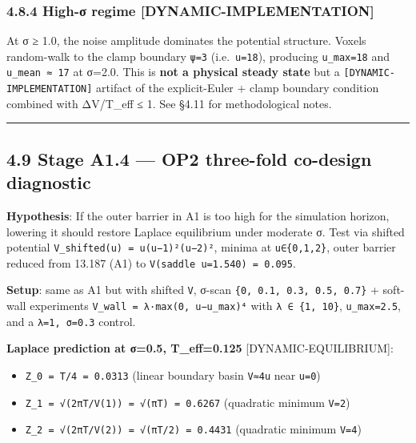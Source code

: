 \documentclass[
]{article}
\providecommand{\tightlist}{%
  \setlength{\itemsep}{0pt}\setlength{\parskip}{0pt}}
\begin{document}
\hypertarget{high-ux3c3-regime-dynamic-implementation}{%
\subsubsection{4.8.4 High-σ regime
{[}DYNAMIC-IMPLEMENTATION{]}}\label{high-ux3c3-regime-dynamic-implementation}}

At σ ≥ 1.0, the noise amplitude dominates the potential structure.
Voxels random-walk to the clamp boundary
\texttt{\textbar{}ψ\textbar{}=3} (i.e.~\texttt{u=18}), producing
\texttt{u\_max=18} and \texttt{u\_mean\ ≈\ 17} at σ=2.0. This is
\textbf{not a physical steady state} but a
\texttt{{[}DYNAMIC-IMPLEMENTATION{]}} artifact of the explicit-Euler +
clamp boundary condition combined with ΔV/T\_eff ≤ 1. See §4.11 for
methodological notes.

\begin{center}\rule{0.5\linewidth}{0.5pt}\end{center}

\hypertarget{stage-a1.4-op2-three-fold-co-design-diagnostic}{%
\subsection{4.9 Stage A1.4 --- OP2 three-fold co-design
diagnostic}\label{stage-a1.4-op2-three-fold-co-design-diagnostic}}

\textbf{Hypothesis}: If the outer barrier in A1 is too high for the
simulation horizon, lowering it should restore Laplace equilibrium under
moderate σ. Test via shifted potential
\texttt{V\_shifted(u)\ =\ u(u−1)²(u−2)²}, minima at
\texttt{u∈\{0,1,2\}}, outer barrier reduced from 13.187 (A1) to
\texttt{V(saddle\ u=1.540)\ =\ 0.095}.

\textbf{Setup}: same as A1 but with shifted \texttt{V}, σ-scan
\texttt{\{0,\ 0.1,\ 0.3,\ 0.5,\ 0.7\}} + soft-wall experiments
\texttt{V\_wall\ =\ λ·max(0,\ u−u\_max)⁴} with
\texttt{λ\ ∈\ \{1,\ 10\}}, \texttt{u\_max=2.5}, and a
\texttt{λ=1,\ σ=0.3} control.

\textbf{Laplace prediction at σ=0.5, T\_eff=0.125}
{[}DYNAMIC-EQUILIBRIUM{]}:

\begin{itemize}
\tightlist
\item
  \texttt{Z\_0\ =\ T/4\ =\ 0.0313} (linear boundary basin \texttt{V≈4u}
  near \texttt{u=0})
\item
  \texttt{Z\_1\ =\ √(2πT/V\textquotesingle{}\textquotesingle{}(1))\ =\ √(πT)\ =\ 0.6267}
  (quadratic minimum \texttt{V\textquotesingle{}\textquotesingle{}=2})
\item
  \texttt{Z\_2\ =\ √(2πT/V\textquotesingle{}\textquotesingle{}(2))\ =\ √(πT/2)\ =\ 0.4431}
  (quadratic minimum \texttt{V\textquotesingle{}\textquotesingle{}=4})
\end{itemize}
\end{document}
